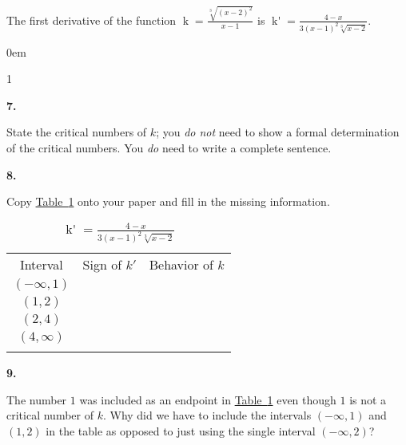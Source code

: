 \documentclass[12pt,]{book}
\theoremstyle{plain}
\theoremstyle{definition}
\numberwithin{equation}{section}
\newcommand{\hrulethin}  {\noalign{\hrule height 0.04em}}
\newcommand{\hrulemedium}{\noalign{\hrule height 0.07em}}
\newcommand{\hrulethick} {\noalign{\hrule height 0.11em}}
\newenvironment{exercisegroup}%
{\medskip\noindent}%
{\par\bigskip}%
\newlength{\exercisegroupindent}%
\newlength{\exercisegroupitemwidth}%
\newenvironment{exercisegrouplist}%
{\vspace{-\partopsep}%
\begin{adjustwidth}{\exercisegroupindent}{0em}}%
{\end{adjustwidth}%
\vspace{-\partopsep}%
\vspace{\baselineskip}}%
\newenvironment{exercisegroupbycol}[1]%
{\begin{exercisegrouplist}%
\vspace{-\multicolsep}%
\begin{multicols}{#1}%
\setlength{\parindent}{0em}%
\setlength{\exercisegroupitemwidth}{\linewidth}}%
{\end{multicols}%
\vspace{-\multicolsep}%
\end{exercisegrouplist}}%
\newenvironment{exercisegroupitem}[1]%
{\begin{minipage}[t]{\exercisegroupitemwidth}
\vspace{0pt}%
{\bfseries#1}%
\rule{0pt}{\baselineskip}}{\strut%
\end{minipage}%
\hspace{\columnsep}}%
\providecommand\phantomsection{}
\newcommand{\fe}[2]{\mathop{{#1}{\left(#2\right)}}}
\newcommand{\ointerval}[2]{\left(#1,#2\right)}
\newcommand{\fd}[1]{#1'}
\begin{document}
\begin{exercisegroup}%
The first derivative of the function \(\fe{k}{x}=\frac{\sqrt[3]{(x-2)^2}}{x-1}\) is \(\fe{\fd{k}}{t}=\frac{4-x}{3(x-1)^2\sqrt[3]{x-2}}\).%
\par
\begin{exercisegroupbycol}{1}%
\begin{exercisegroupitem}{7. }\phantomsection\hypertarget{exercise-27}{\null}
State the critical numbers of \(k\); you \emph{do not} need to show a formal determination of the critical numbers.  You \emph{do} need to write a complete sentence.%
\end{exercisegroupitem}%
\par%
\begin{exercisegroupitem}{8. }\phantomsection\hypertarget{exercise-28}{\null}
Copy \hyperref[table-trient-rational-sign-table]{Table~\ref*{table-trient-rational-sign-table}} onto your paper and fill in the missing information.%
\begin{table}
\centering
\caption{\(\fe{\fd{k}}{t}=\frac{4-x}{3(x-1)^2\sqrt[3]{x-2}}\)\label{table-trient-rational-sign-table}}
\begin{tabular}{ccc}\hrulethick
Interval&Sign of \(\fd{k}\)&Behavior of \(k\)\\\hrulemedium
\(\ointerval{-\infty}{1}\)&&\\\hrulethin
\(\ointerval{1}{2}\)&&\\\hrulethin
\(\ointerval{2}{4}\)&&\\\hrulethin
\(\ointerval{4}{\infty}\)&&\\\hrulethick
\end{tabular}
\end{table}
\end{exercisegroupitem}%
\par%
\begin{exercisegroupitem}{9. }\phantomsection\hypertarget{exercise-29}{\null}
The number \(1\) was included as an endpoint in \hyperref[table-trient-rational-sign-table]{Table~\ref*{table-trient-rational-sign-table}} even though \(1\) is not a critical number of \(k\).  Why did we have to include the intervals \(\ointerval{-\infty}{1}\) and \(\ointerval{1}{2}\) in the table as opposed to just using the single interval \(\ointerval{-\infty}{2}\)?%
\end{exercisegroupitem}%
\par%
\end{exercisegroupbycol}%
\end{exercisegroup}%
\end{document}
